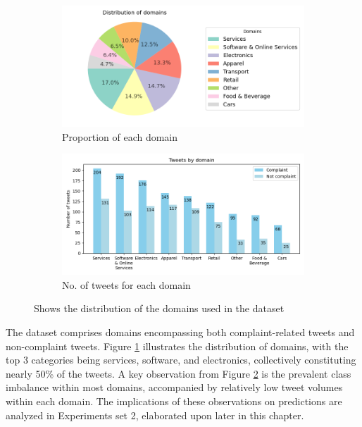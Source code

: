 \begin{figure}[htbp]
    \centering
    \captionsetup{font=small}
    \begin{subfigure}{0.49\textwidth}
        \centering
        \includegraphics[width=\linewidth]{figures/domain_dist.png}
        \caption{Proportion of each domain}
        \label{fig: domain_dist_pct}
    \end{subfigure}
    \hfill
    \begin{subfigure}{0.49\textwidth}
        \centering
        \includegraphics[width=\linewidth]{figures/domain_counts_bar_norandom.png}
        \caption{No. of tweets for each domain}
        \label{fig: domain_dist_count}
    \end{subfigure}
    \caption{Shows the distribution of the domains used in the dataset}
    \label{fig: compl_main_dist}
\end{figure}

The dataset comprises domains encompassing both complaint-related tweets and non-complaint tweets. Figure \ref{fig: domain_dist_pct} illustrates the distribution of domains, with the top 3 categories being services, software, and electronics, collectively constituting nearly 50\% of the tweets. A key observation from Figure \ref{fig: domain_dist_count} is the prevalent class imbalance within most domains, accompanied by relatively low tweet volumes within each domain. The implications of these observations on predictions are analyzed in Experiments set 2, elaborated upon later in this chapter.

